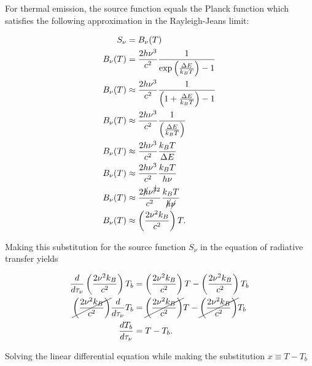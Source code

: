 \documentclass[12pt]{article}
\begin{document}
{\noindent}For thermal emission, the source function equals the Planck function which satisfies the following approximation in the Rayleigh-Jeans limit:

\begin{equation*}
\begin{split}
    S_\nu &= B_\nu(T) \\
    B_\nu(T) &= \frac{2h\nu^3}{c^2} \frac{1}{\exp\left(\frac{\Delta E}{k_BT}\right) - 1} \\
    B_\nu(T) &\approx \frac{2h\nu^3}{c^2} \frac{1}{\left(1 + \frac{\Delta E}{k_BT}\right) - 1} \\
    B_\nu(T) &\approx \frac{2h\nu^3}{c^2} \frac{1}{\left(\frac{\Delta E}{k_BT}\right)} \\
    B_\nu(T) &\approx \frac{2h\nu^3}{c^2} \frac{k_BT}{\Delta E} \\
    B_\nu(T) &\approx \frac{2h\nu^3}{c^2} \frac{k_BT}{h\nu} \\
    B_\nu(T) &\approx \frac{2\cancel{h}\nu^{\cancel{3}2}}{c^2} \frac{k_BT}{\cancel{h}\cancel{\nu}} \\
    B_\nu(T) &\approx \left(\frac{2\nu^2k_B}{c^2}\right) T.
\end{split}
\end{equation*}

{\noindent}Making this substitution for the source function $S_\nu$ in the equation of radiative transfer yields

\begin{equation*}
\begin{split}
    \frac{d}{d\tau_\nu} \left( \frac{2\nu^2k_B}{c^2} \right) T_b &= \left(\frac{2\nu^2k_B}{c^2}\right) T - \left( \frac{2\nu^2k_B}{c^2} \right) T_b \\
    \cancel{\left( \frac{2\nu^2k_B}{c^2} \right)} \frac{d}{d\tau_\nu} T_b &= \cancel{\left(\frac{2\nu^2k_B}{c^2}\right)} T - \cancel{\left( \frac{2\nu^2k_B}{c^2} \right)} T_b \\
    \frac{dT_b}{d\tau_\nu} &= T - T_b.
\end{split}
\end{equation*}

{\noindent}Solving the linear differential equation while making the substitution $x\equiv T-T_b$
\end{document}
